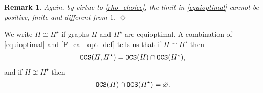 \documentclass[11pt,reqno]{amsart}
\numberwithin{equation}{section}
\newtheorem{remark}[theo]{Remark}
\begin{document}
\begin{itemize}
{\begin{remark} {\em
    Again, by virtue to \eqref{rho_choice}, the limit in \eqref{equioptimal} cannot be positive, finite and different from $1$.}
    \hfill ${\Diamond}$
\end{remark} 

\item[$\circ$]
We write ${H}\cong {H^{\star}}$ if graphs $H$ and ${H^{\star}}$ are equioptimal. A combination of \eqref{equioptimal} and \eqref{F_cal_opt_def} tells us that if ${H}\cong {H^{\star}}$ then
\begin{align}
    {\tt OCS}({H},{H^{\star}}) = {\tt OCS}({H})\cap {\tt OCS}({H^{\star}}),\label{GCS_cong}
\end{align}
and if ${H}\not\cong {H^{\star}}$ then
\begin{align}
    {\tt OCS}({H})\cap {\tt OCS}({H^{\star}})=\varnothing.\label{GCS_not_cong}
\end{align}

}
\end{itemize}
\end{document}
